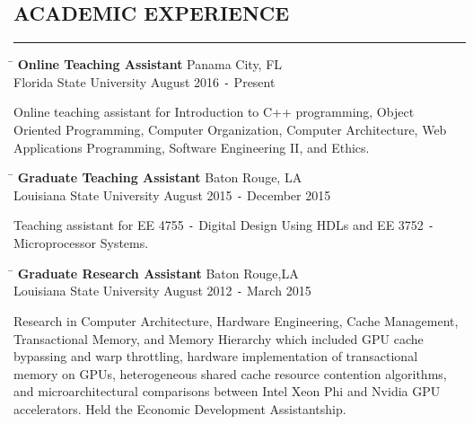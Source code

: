 \documentclass{res}
\begin{document}
\begin{resume}
\section{ACADEMIC EXPERIENCE}
	\vspace{0.005in}	
	\rule{\textwidth}{0.5pt}
	\vspace{-0.4in}
	\begin{tabbing}
		\hspace{4.65in}\= \kill %
		{\bf Online Teaching Assistant} \> \hspace{0.3in}Panama City, FL \\
		Florida State University \hspace{3.08in} August 2016 \texttt{-} Present
	\end{tabbing}\vspace{-20pt}
	\vspace{8pt}Online teaching assistant for Introduction to C++ programming, Object Oriented Programming, Computer Organization, Computer Architecture, Web Applications Programming, Software Engineering II, and Ethics.
	\vspace{-0.2in}
	\begin{tabbing}
		\hspace{4.65in}\= \kill %
		{\bf Graduate Teaching Assistant} \> \hspace{0.3in}Baton Rouge, LA \\
		Louisiana State University \hspace{2.5in} August 2015 \texttt{-} December 2015
	\end{tabbing}\vspace{-20pt}
	\vspace{8pt}Teaching assistant for EE 4755 \texttt{-} Digital Design Using HDLs and EE 3752 \texttt{-} Microprocessor Systems.
	\vspace{-0.35in}
	\begin{tabbing}
		\hspace{4.38in}\=  \kill %
		{\bf Graduate Research Assistant}\> \hspace{0.62in}Baton Rouge,LA \\
		Louisiana State University     \>August 2012 \texttt{-} March 2015
	\end{tabbing}\vspace{-20pt}      %
	\vspace{8pt}Research in Computer Architecture, Hardware Engineering, Cache Management, Transactional Memory, and Memory Hierarchy which included GPU cache bypassing and warp throttling, hardware implementation of transactional memory on GPUs, heterogeneous shared cache resource contention algorithms, and microarchitectural comparisons between Intel Xeon Phi and Nvidia GPU accelerators. Held the Economic Development Assistantship.

\end{resume}
\end{document}
